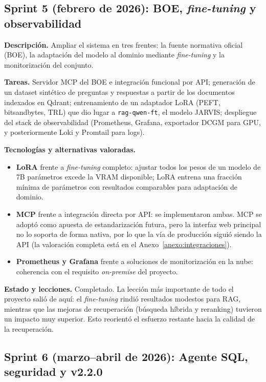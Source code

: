 \subsection{Sprint 5 (febrero de 2026): BOE, \textit{fine-tuning} y observabilidad}

\textbf{Descripción.} Ampliar el sistema en tres frentes: la fuente normativa oficial (BOE), la adaptación del modelo al dominio mediante \textit{fine-tuning} y la monitorización del conjunto.

\textbf{Tareas.} Servidor MCP del BOE e integración funcional por API; generación de un dataset sintético de preguntas y respuestas a partir de los documentos indexados en Qdrant; entrenamiento de un adaptador LoRA (PEFT, bitsandbytes, TRL) que dio lugar a \texttt{rag-qwen-ft}, el modelo JARVIS; despliegue del stack de observabilidad (Prometheus, Grafana, exportador DCGM para GPU, y posteriormente Loki y Promtail para logs).

\textbf{Tecnologías y alternativas valoradas.}
\begin{itemize}
    \item \textbf{LoRA} frente a \textit{fine-tuning} completo: ajustar todos los pesos de un modelo de 7B parámetros excede la VRAM disponible; LoRA entrena una fracción mínima de parámetros con resultados comparables para adaptación de dominio.
    \item \textbf{MCP} frente a integración directa por API: se implementaron ambas. MCP se adoptó como apuesta de estandarización futura, pero la interfaz web principal no lo soporta de forma nativa, por lo que la vía de producción siguió siendo la API (la valoración completa está en el Anexo~\ref{anexo:integraciones}).
    \item \textbf{Prometheus y Grafana} frente a soluciones de monitorización en la nube: coherencia con el requisito \textit{on-premise} del proyecto.
\end{itemize}

\textbf{Estado y lecciones.} Completado. La lección más importante de todo el proyecto salió de aquí: el \textit{fine-tuning} rindió resultados modestos para RAG, mientras que las mejoras de recuperación (búsqueda híbrida y reranking) tuvieron un impacto muy superior. Esto reorientó el esfuerzo restante hacia la calidad de la recuperación.

\subsection{Sprint 6 (marzo--abril de 2026): Agente SQL, seguridad y v2.2.0}

